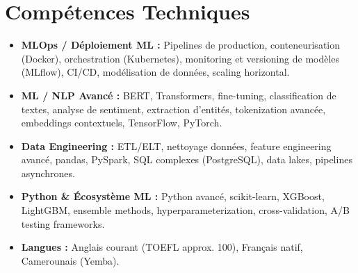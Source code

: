 \documentclass[a4paper,11pt]{article}
\begin{document}
\section{Comp\'etences Techniques}
\begin{itemize}[leftmargin=*, nosep]
    \item \small{\textbf{MLOps / D\'eploiement ML :} Pipelines de production, conteneurisation (Docker), orchestration (Kubernetes), monitoring et versioning de mod\`eles (MLflow), CI/CD, mod\'elisation de donn\'ees, scaling horizontal.}
    \item \small{\textbf{ML / NLP Avanc\'e :} BERT, Transformers, fine-tuning, classification de textes, analyse de sentiment, extraction d'entit\'es, tokenization avanc\'ee, embeddings contextuels, TensorFlow, PyTorch.}
    \item \small{\textbf{Data Engineering :} ETL/ELT, nettoyage donn\'ees, feature engineering avanc\'e, pandas, PySpark, SQL complexes (PostgreSQL), data lakes, pipelines asynchrones.}
    \item \small{\textbf{Python \& \'Ecosyst\`eme ML :} Python avanc\'e, scikit-learn, XGBoost, LightGBM, ensemble methods, hyperparameterization, cross-validation, A/B testing frameworks.}
    \item \small{\textbf{Langues :} Anglais courant (TOEFL approx. 100), Fran\c{c}ais natif, Camerounais (Yemba).}
\end{itemize}
\end{document}
